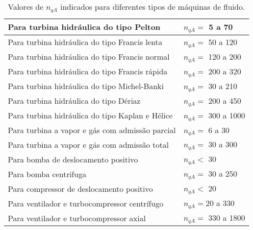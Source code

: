     \begin{table}[htb]
        \centering
        \caption{Valores de $n_{qA}$ indicados para diferentes tipos de máquinas de fluido.}
        \label{tab-na}
        \begin{tabular}{l | l}
            \hline
            Para turbina hidráulica do tipo Pelton & $n_{qA} =$ 5 a 70 \\
            \hline
            Para turbina hidráulica do tipo Francis lenta & $n_{qA} =$ 50 a 120 \\
            \hline
            Para turbina hidráulica do tipo Francis normal & $n_{qA} =$ 120 a 200 \\
            \hline
            Para turbina hidráulica do tipo Francis rápida & $n_{qA} =$ 200 a 320 \\
            \hline
            Para turbina hidráulica do tipo Michel-Banki  & $n_{qA} =$ 30 a 210 \\
            \hline
            Para turbina hidráulica do tipo Dériaz  & $n_{qA} =$ 200 a 450 \\
            \hline
            Para turbina hidráulica do tipo Kaplan e Hélice  & $n_{qA} =$ 300 a 1000 \\
            \hline
            Para turbina a vapor e gás com admissão parcial & $n_{qA} =$ 6 a 30 \\
            \hline
            Para turbina a vapor e gás com admissão total & $n_{qA} =$ 30 a 300 \\
            \hline
            Para bomba de deslocamento positivo & $n_{qA} <$  30 \\
            \hline
            Para bomba centrifuga & $n_{qA} =$  30 a 250 \\
            \hline
            Para compressor de deslocamento positivo & $n_{qA} <$ 20 \\
            \hline
            Para ventilador e turbocompressor centrífugo & $n_{qA} = 20$ a 330 \\
            \hline
            Para ventilador e turbocompressor axial & $n_{qA} =$ 330 a 1800 \\
            \hline
        \end{tabular} %
    \end{table}
